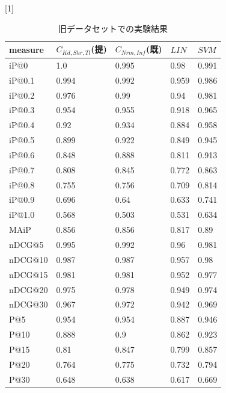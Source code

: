 \begin{table}[h]
  \caption{旧データセットでの実験結果} 
  \label{tbl:resultOld}
  \begin{center} {
\scalebox{0.9}[1]{
    \begin{tabular}{|l|l|l|ll|} \hline
      measure&$C_{Kd,Shr,Tl}$(提)&$C_{Nrm,Inf}$(既)&$LIN$&$SVM$\\ \hline
iP@0&1.0&0.995&0.98&0.991\\
iP@0.1&0.994&0.992&0.959&0.986\\
iP@0.2&0.976&0.99&0.94&0.981\\
iP@0.3&0.954&0.955&0.918&0.965\\
iP@0.4&0.92&0.934&0.884&0.958\\
iP@0.5&0.899&0.922&0.849&0.945\\
iP@0.6&0.848&0.888&0.811&0.913\\
iP@0.7&0.808&0.845&0.772&0.863\\
iP@0.8&0.755&0.756&0.709&0.814\\
iP@0.9&0.696&0.64&0.633&0.741\\
iP@1.0&0.568&0.503&0.531&0.634\\ \hline
MAiP&0.856&0.856&0.817&0.89\\ \hline
nDCG@5&0.995&0.992&0.96&0.981\\
nDCG@10&0.987&0.987&0.957&0.98\\
nDCG@15&0.981&0.981&0.952&0.977\\
nDCG@20&0.975&0.978&0.949&0.974\\
nDCG@30&0.967&0.972&0.942&0.969\\ \hline
P@5&0.954&0.954&0.887&0.946\\
P@10&0.888&0.9&0.862&0.923\\
P@15&0.81&0.847&0.799&0.857\\
P@20&0.764&0.775&0.732&0.794\\
P@30&0.648&0.638&0.617&0.669\\ \hline
\end{tabular}
  }
    }
  \end{center}
\end{table}

